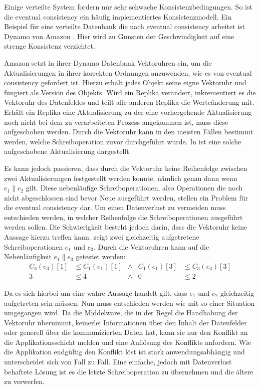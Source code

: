 Einige verteilte System fordern nur sehr schwache Konsistenzbedingungen.
So ist die eventual consistency ein häufig implementiertes Konsistenzmodell.
Ein Beispiel für eine verteilte Datenbank die nach eventual consistency arbeitet ist Dynamo von Amazon \cite{decandia2007dynamo}.
Hier wird zu Gunsten der Geschwindigkeit auf eine strenge Konsistenz verzichtet.

Amazon setzt in ihrer Dynamo Datenbank Vektoruhren ein, um die Aktualisierungen in ihrer korrekten Ordnungen anzuwenden, wie es von eventual consistency gefordert ist.
Hierzu erhält jedes Objekt seine eigne Vektoruhr und fungiert als Version des Objekts.
Wird ein Replika verändert, inkrementiert es die Vektoruhr des Datenfeldes und teilt alle anderen Replika die Werteänderung mit.
Erhält ein Replika eine Aktualisierung zu der eine vorhergehende Aktualisierung noch nicht bei dem zu verarbeiteten Prozess angekommen ist, muss diese aufgeschoben werden.
Durch die Vektoruhr kann in den meisten Fällen bestimmt werden, welche Schreiboperation zuvor durchgeführt wurde.
In  ist eine solche aufgeschobene Aktualisierung dargestellt.

Es kann jedoch passieren, dass durch die Vektoruhr keine Reihenfolge zwischen zwei Aktualisierungen festgestellt werden konnte, nämlich genau dann wenn $e_1 \parallel e_2$ gilt.
Diese nebenläufige Schreiboperationen, also Operationen die noch nicht abgeschlossen sind bevor Neue ausgeführt werden, stellen ein Problem für die eventual consistency dar.
Um einen Datenverlust zu vermeiden muss entschieden werden, in welcher Reihenfolge die Schreiboperationen ausgeführt werden sollen.
Die Schwierigkeit besteht jedoch darin, dass die Vektoruhr keine Aussage hierzu treffen kann.
 zeigt zwei gleichzeitig aufgetretene Schreiboperationen $e_1$ und $e_3$.
Durch die Vektoruhren kann auf die Nebenläufigkeit $e_1 \parallel e_3$ getestet werden:
\begin{align*}
      C_3(e_3)[1] & \leq C_1(e_1)[1] & \wedge &  C_1(e_1)[3] & \leq C_3(e_3)[3] \\
        3         & \leq 4           & \wedge & 0           & \leq 2
\end{align*}

Da es sich hierbei um eine wahre Aussage handelt gilt, dass $e_1$ und $e_2$ gleichzeitig aufgetreten sein müssen.
Nun muss entschieden werden wie mit so einer Situation umgegangen wird.
Da die Middelware, die in der Regel die Handhabung der Vektoruhr übernimmt, keinerlei Informationen über den Inhalt der Datenfelder oder generell über die kommunizierten Daten hat, kann sie nur den Konflikt an die Applikationsschicht melden und eine Auflösung des Konflikts anfordern.
Wie die Applikation endgültig den Konflikt löst ist stark anwendungsabhängig und unterscheidet sich von Fall zu Fall.
Eine einfache, jedoch mit Datenverlust behaftete Lösung ist es die letzte Schreiboperation zu übernehmen und die ältere zu verwerfen.

